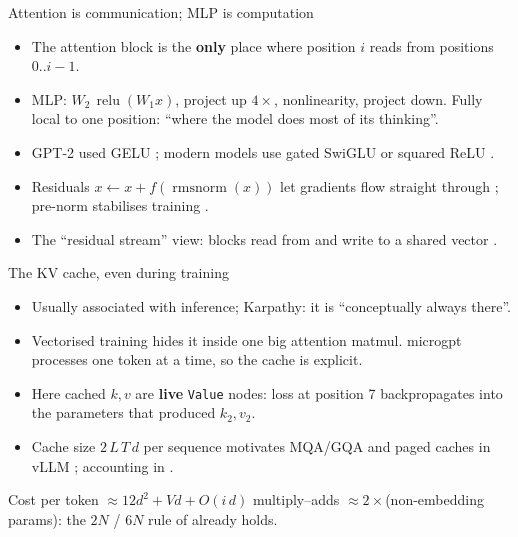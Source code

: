 \documentclass[aspectratio=169,11pt]{beamer}
\newcommand{\rmsnorm}{\operatorname{rmsnorm}}
\newcommand{\relu}{\operatorname{relu}}
\begin{document}
\begin{frame}{Attention is communication; MLP is computation}
\begin{itemize}
  \item The attention block is the \textbf{only} place where position $i$ reads from positions $0..i{-}1$.
  \item MLP: $W_2\,\relu(W_1 x)$, project up $4\times$, nonlinearity, project down. Fully local to one position: ``where the model does most of its thinking''.
  \item GPT-2 used GELU \parencite{hendrycks2016gelu}; modern models use gated SwiGLU \parencite{shazeer2020glu,touvron2023llama} or squared ReLU \parencite{so2021primer}.
  \item Residuals $x \leftarrow x + f(\rmsnorm(x))$ let gradients flow straight through \parencite{he2016resnet}; pre-norm stabilises training \parencite{xiong2020prelayernorm}.
  \item The ``residual stream'' view: blocks read from and write to a shared vector \parencite{elhage2021mathematical}.
\end{itemize}
\end{frame}

\begin{frame}{The KV cache, even during training}
\begin{itemize}
  \item Usually associated with inference; Karpathy: it is ``conceptually always there''.
  \item Vectorised training hides it inside one big attention matmul. microgpt processes one token at a time, so the cache is explicit.
  \item Here cached $k,v$ are \textbf{live} \texttt{Value} nodes: loss at position 7 backpropagates into the parameters that produced $k_2, v_2$.
  \item Cache size $2\,L\,T\,d$ per sequence motivates MQA/GQA \parencite{shazeer2019mqa,ainslie2023gqa} and paged caches in vLLM \parencite{kwon2023vllm}; accounting in \textcite{pope2022efficiently}.
\end{itemize}
\vfill
Cost per token $\approx 12d^2 + Vd + O(i\,d)$ multiply--adds $\approx 2\times$(non-embedding params): the $2N$ / $6N$ rule of \textcite{kaplan2020scaling} already holds.
\end{frame}

\end{document}
